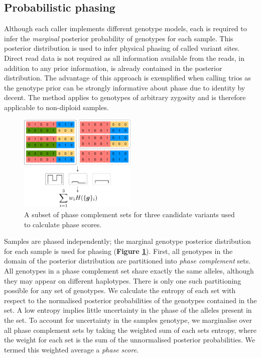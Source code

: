 \documentclass[notitlepage, twocolumn]{article}
\begin{document}
\subsection*{Probabilistic phasing}

Although each caller implements different genotype models, each is required to infer the \emph{marginal} posterior probability of genotypes for each sample. This posterior distribution is used to infer physical phasing of called variant sites. Direct read data is not required as all information available from the reads, in addition to any prior information, is already contained in the posterior distribution. The advantage of this approach is exemplified when calling trios as the genotype prior can be strongly informative about phase due to identity by decent. The method applies to genotypes of arbitrary zygosity and is therefore applicable to non-diploid samples.

\begin{figure}[ht]
    \centering
    \includegraphics[width=0.5\textwidth]{figures/phasing}
    \caption{A subset of phase complement sets for three candidate variants used to calculate phase scores.}
    \label{fig:phasing}
\end{figure}

Samples are phased independently; the marginal genotype posterior distribution for each sample is used for phasing (\textbf{Figure \ref{fig:phasing}}). First, all genotypes in the domain of the posterior distribution are partitioned into \emph{phase complement} sets. All genotypes in a phase complement set share exactly the same alleles, although they may appear on different haplotypes. There is only one such partitioning possible for any set of genotypes. We calculate the entropy of each set with respect to the normalised posterior probabilities of the genotypes contained in the set. A low entropy implies little uncertainty in the phase of the alleles present in the set. To account for uncertainty in the samples genotype, we marginalise over all phase complement sets by taking the weighted sum of each sets entropy, where the weight for each set is the sum of the unnormalised posterior probabilities. We termed this weighted average a \emph{phase score}.
\end{document}
